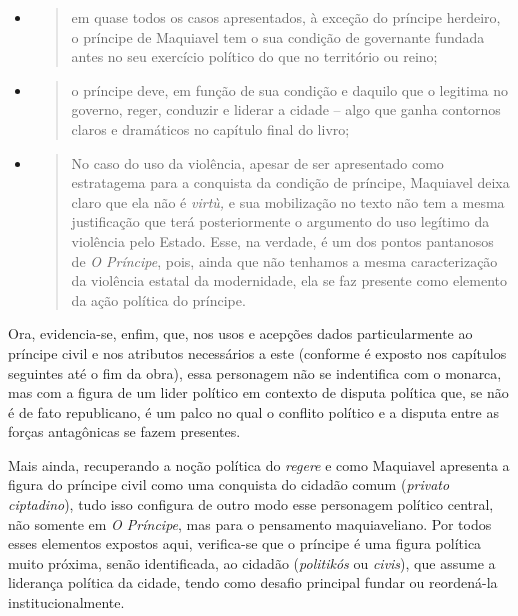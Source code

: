 \begin{itemize}
\item
  \begin{quote}
  em quase todos os casos apresentados, à exceção do príncipe herdeiro,
  o príncipe de Maquiavel tem o sua condição de governante fundada antes
  no seu exercício político do que no território ou reino;
  \end{quote}
\item
  \begin{quote}
  o príncipe deve, em função de sua condição e daquilo que o legitima no
  governo, reger, conduzir e liderar a cidade -- algo que ganha
  contornos claros e dramáticos no capítulo final do livro;
  \end{quote}
\item
  \begin{quote}
  No caso do uso da violência, apesar de ser apresentado como
  estratagema para a conquista da condição de príncipe, Maquiavel deixa
  claro que ela não é \emph{virtù,} e sua mobilização no texto não tem a
  mesma justificação que terá posteriormente o argumento do uso legítimo
  da violência pelo Estado. Esse, na verdade, é um dos pontos pantanosos
  de \emph{O Príncipe}, pois, ainda que não tenhamos a mesma
  caracterização da violência estatal da modernidade, ela se faz
  presente como elemento da ação política do príncipe.
  \end{quote}
\end{itemize}

Ora, evidencia-se, enfim, que, nos usos e acepções dados particularmente
ao príncipe civil e nos atributos necessários a este (conforme é exposto
nos capítulos seguintes até o fim da obra), essa personagem não se
indentifica com o monarca, mas com a figura de um lider político em
contexto de disputa política que, se não é de fato republicano, é um
palco no qual o conflito político e a disputa entre as forças
antagônicas se fazem presentes.

Mais ainda, recuperando a noção política do \emph{regere} e como
Maquiavel apresenta a figura do príncipe civil como uma conquista do
cidadão comum (\emph{privato ciptadino}), tudo isso configura de outro
modo esse personagem político central, não somente em \emph{O Príncipe},
mas para o pensamento maquiaveliano. Por todos esses elementos expostos
aqui, verifica-se que o príncipe é uma figura política muito próxima,
senão identificada, ao cidadão (\emph{politikós} ou \emph{civis}), que
assume a liderança política da cidade, tendo como desafio principal
fundar ou reordená-la institucionalmente.


